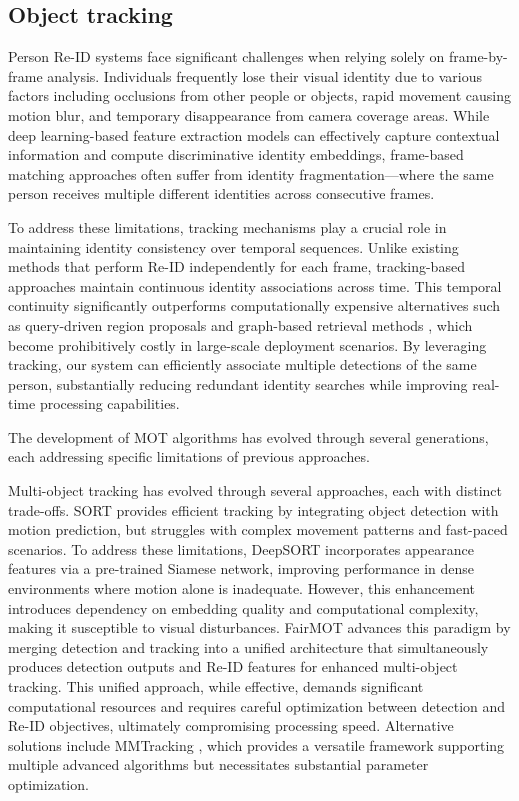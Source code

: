 \documentclass[../main.tex]{subfiles}
\begin{document}
\subsection{Object tracking}
\label{sec:objtrack}

Person Re-ID systems face significant challenges when relying solely on frame-by-frame analysis. Individuals frequently lose their visual identity due to various factors including occlusions from other people or objects, rapid movement causing motion blur, and temporary disappearance from camera coverage areas. While deep learning-based feature extraction models can effectively capture contextual information and compute discriminative identity embeddings, frame-based matching approaches often suffer from identity fragmentation—where the same person receives multiple different identities across consecutive frames.

To address these limitations, tracking mechanisms play a crucial role in maintaining identity consistency over temporal sequences. Unlike existing methods that perform Re-ID independently for each frame, tracking-based approaches maintain continuous identity associations across time. This temporal continuity significantly outperforms computationally expensive alternatives such as query-driven region proposals \cite{munjal2019queryguidedendtoendpersonsearch} and graph-based retrieval methods \cite{zhu2025graphbasedapproachesfunctionalitiesretrievalaugmented}, which become prohibitively costly in large-scale deployment scenarios. By leveraging tracking, our system can efficiently associate multiple detections of the same person, substantially reducing redundant identity searches while improving real-time processing capabilities.

The development of MOT algorithms has evolved through several generations, each addressing specific limitations of previous approaches. 

Multi-object tracking has evolved through several approaches, each with distinct trade-offs. SORT \cite{sort} provides efficient tracking by integrating object detection with motion prediction, but struggles with complex movement patterns and fast-paced scenarios. To address these limitations, DeepSORT \cite{deepsort} incorporates appearance features via a pre-trained Siamese network, improving performance in dense environments where motion alone is inadequate. However, this enhancement introduces dependency on embedding quality and computational complexity, making it susceptible to visual disturbances. FairMOT \cite{fairmot} advances this paradigm by merging detection and tracking into a unified architecture that simultaneously produces detection outputs and Re-ID features for enhanced multi-object tracking. This unified approach, while effective, demands significant computational resources and requires careful optimization between detection and Re-ID objectives, ultimately compromising processing speed. Alternative solutions include MMTracking \cite{mmtracking}, which provides a versatile framework supporting multiple advanced algorithms but necessitates substantial parameter optimization.
\end{document}
